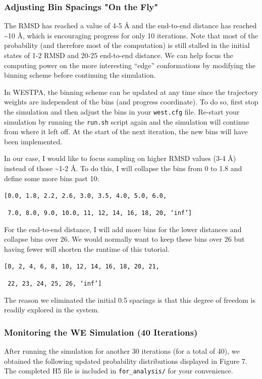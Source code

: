 \documentclass[9pt,tutorial,ASAPversion]{livecoms}
\begin{document}
\subsubsection{Adjusting Bin Spacings "On the Fly"}

The RMSD has reached a value of 4-5 \AA{} and the end-to-end distance has reached \textasciitilde 10 \AA{}, which is encouraging progress for only 10 iterations. 
Note that most of the probability (and therefore most of the computation) is still stalled in the initial states of 1-2 RMSD and 20-25 end-to-end distance. 
We can help  focus the computing power on the more interesting “edge” conformations by modifying the binning scheme before continuing the simulation.
  
In WESTPA, the binning scheme can be updated at any time since the trajectory weights are independent of the bins (and progress coordinate). 
To do so, first stop the simulation and then adjust the bins in your \verb|west.cfg| file. 
Re-start your simulation by running the \verb|run.sh| script again and the simulation will continue from where it left off. 
At the start of the next iteration, the new bins will have been implemented.  

In our case, I would like to focus sampling on higher RMSD values (3-4 \AA) instead of those \textasciitilde 1-2 \AA. 
To do this, I will collapse the bins from 0 to 1.8 and define some more bins past 10:

\verb|[0.0, 1.8, 2.2, 2.6, 3.0, 3.5, 4.0, 5.0, 6.0,|

\verb| 7.0, 8.0, 9.0, 10.0, 11, 12, 14, 16, 18, 20, ‘inf’]|

For the end-to-end distance, I will add more bins for the lower distances and collapse bins over 26. 
We would normally want to keep these bins over 26 but having fewer will shorten the runtime of this tutorial.

\verb|[0, 2, 4, 6, 8, 10, 12, 14, 16, 18, 20, 21,|

\verb| 22, 23, 24, 25, 26, ‘inf’]|

The reason we eliminated the initial 0.5 spacings is that this degree of freedom is readily explored in the system.

\subsubsection{Monitoring the WE Simulation (40 Iterations)}

After running the simulation for another 30 iterations (for a total of 40), we obtained the following updated probability distributions displayed in Figure 7.
The completed H5 file is included in \verb|for_analysis/| for your convenience.
\end{document}
